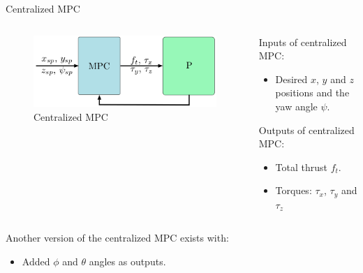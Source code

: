 \documentclass{thesisbeamer}
\newcommand\Fontvi{\fontsize{9}{10}\selectfont}
\begin{document}
\begin{frame}{Centralized MPC}
	\Fontvi

	\begin{columns}
		\begin{column}{0.5\textwidth}
			\begin{figure}
				\includegraphics[width=\textwidth]{Images/Control/centralized_mpc.png}
				\caption{Centralized MPC}
			\end{figure}
		\end{column}
		\begin{column}{0.5\textwidth}
			Inputs of centralized MPC:
			\begin{itemize}
				\item Desired $x$, $y$ and $z$ positions and the yaw angle $\psi$.
			\end{itemize}
			Outputs of centralized MPC:
			\begin{itemize}
				\item Total thrust $f_t$.
				\item Torques: $\tau_x$, $\tau_y$ and $\tau_z$
			\end{itemize}
		\end{column}
	\end{columns}
	\vspace{1cm}
	Another version of the centralized MPC exists with:
	\begin{itemize}
		\item Added $\phi$ and $\theta$ angles as outputs.
	\end{itemize}
\end{frame}
\end{document}
